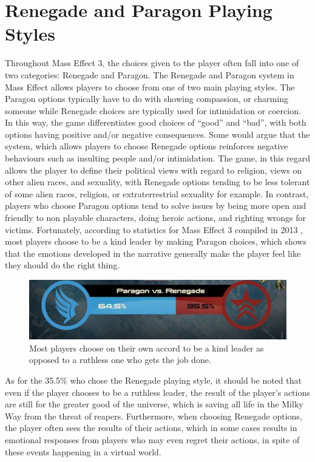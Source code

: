 \documentclass[journal]{IEEEtran}
\begin{document}
\section{Renegade and Paragon Playing Styles}
Throughout Mass Effect 3, the choices given to the player often fall into one
of two categories: Renegade and Paragon. The Renegade and Paragon system in
Mass Effect allows players to choose from one of two main playing styles.
The Paragon options typically have to do with showing compassion, or charming someone while Renegade choices are typically used for intimidation or coercion.
In this way, the game differentiates good choices of ``good'' and ``bad'',
with both options having positive and/or negative consequences.
Some would argue that the system, which allows players to choose Renegade options reinforces negative behaviours such as insulting people and/or intimidation. The game, in this regard allows the player to define their political views with regard to religion, views on other alien races,
and sexuality, with Renegade options tending to be less tolerant of some
alien races, religion, or extraterrestrial sexuality for example.
In contrast, players who choose Paragon options tend to solve issues by being more open and friendly to non playable characters, doing heroic actions, and
righting wrongs for  victims. Fortunately, according to
statistics for Mass Effect 3 compiled in 2013 \cite{ea}, most players choose
to be a kind leader by making Paragon choices, which shows that the emotions
developed in the narrative generally make the player feel like they should
do the right thing.

\begin{figure}[h!]
 \centering
 \includegraphics[width=.485\textwidth]{paragon}
 \caption{Most players choose on their own accord to be a kind leader as opposed to a ruthless one who gets the job done. \cite{ea}}
\end{figure}

As for the 35.5\% who chose the Renegade playing style, it should be noted that even if the player chooses to be a ruthless leader, the result of the player's actions are still for the greater good of the universe, which is saving
all life in the Milky Way from the threat of reapers. Furthermore, when choosing Renegade options, the player often sees the results of their actions,
which in some cases results in emotional responses from players who may even regret their actions, in spite of these events happening in a virtual world.
\end{document}
